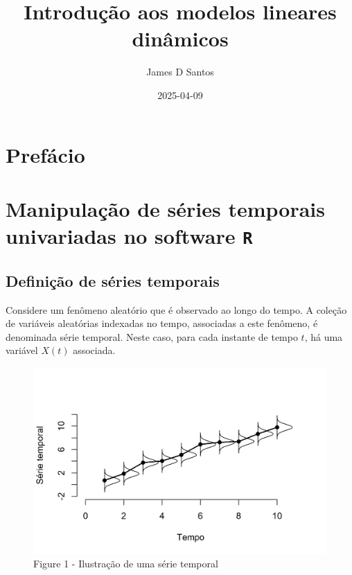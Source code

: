 \documentclass[
  letterpaper,
  DIV=11,
  numbers=noendperiod]{scrreprt}
\title{Introdução aos modelos lineares dinâmicos}
\author{James D Santos}
\date{2025-04-09}
\renewcommand*\contentsname{Table of contents}
\newcommand\contentsname{Table of contents}
\begin{document}
\maketitle

\renewcommand*\contentsname{Table of contents}
{
\hypersetup{linkcolor=}
\setcounter{tocdepth}{2}
\tableofcontents
}


\chapter*{Prefácio}\label{prefuxe1cio}



\chapter{\texorpdfstring{Manipulação de séries temporais univariadas no
software
\texttt{R}}{Manipulação de séries temporais univariadas no software R}}\label{manipulauxe7uxe3o-de-suxe9ries-temporais-univariadas-no-software-r}

\section{Definição de séries
temporais}\label{definiuxe7uxe3o-de-suxe9ries-temporais}

Considere um fenômeno aleatório que é observado ao longo do tempo. A
coleção de variáveis aleatórias indexadas no tempo, associadas a este
fenômeno, é denominada série temporal. Neste caso, para cada instante de
tempo \(t\), há uma variável \(X(t)\) associada.

\begin{figure}[H]

{\centering \includegraphics{intro_files/figure-pdf/figura1-1.png}

}

\caption{Figure 1 - Ilustração de uma série temporal}

\end{figure}%
\end{document}
